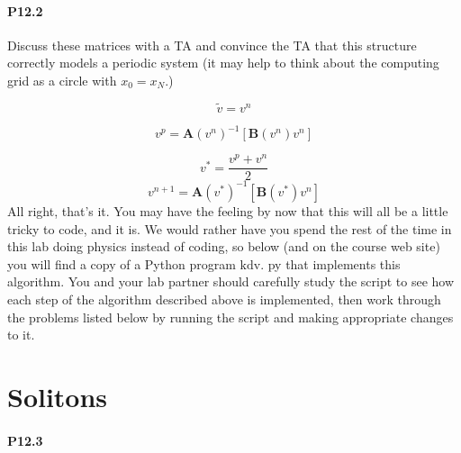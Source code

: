 \paragraph*{P12.2}Discuss these matrices with a TA and convince the TA that this structure correctly models a periodic system (it may help to think about the computing grid as a circle with $x_{0}=x_{N}$.)

\begin{equation}\label{eq:1210}
\tilde{v}=v^{n}
\end{equation}


\begin{equation}\label{eq:1211}
v^{p}=\mathbf{A}\left(v^{n}\right)^{-1}\left[\mathbf{B}\left(v^{n}\right) v^{n}\right]
\end{equation}

\begin{equation}\label{eq:1212}
v^{*}=\frac{v^{p}+v^{n}}{2}
\end{equation}
\begin{equation}\label{eq:1213}
v^{n+1}=\mathbf{A}\left(v^{*}\right)^{-1}\left[\mathbf{B}\left(v^{*}\right) v^{n}\right]
\end{equation}
All right, that\rq s it. You may have the feeling by now that this will all be a little tricky to code, and it is. We would rather have you spend the rest of the time in this lab doing physics instead of coding, so below (and on the course web site) you will find a copy of a Python program $\mathrm{kdv}$. py that implements this algorithm. You and your lab partner should carefully study the script to see how each step of the algorithm described above is implemented, then work through the problems listed below by running the script and making appropriate changes to it.

\section*{Solitons}
\paragraph*{P12.3}

